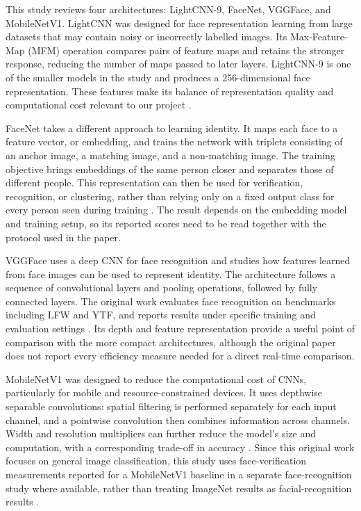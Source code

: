 \documentclass[11pt,a4paper,twocolumn]{article}
\begin{document}
This study reviews four architectures: LightCNN-9, FaceNet, VGGFace, and MobileNetV1. LightCNN was designed for face representation learning from large datasets that may contain noisy or incorrectly labelled images. Its Max-Feature-Map (MFM) operation compares pairs of feature maps and retains the stronger response, reducing the number of maps passed to later layers. LightCNN-9 is one of the smaller models in the study and produces a 256-dimensional face representation. These features make its balance of representation quality and computational cost relevant to our project \cite{wu2018lightcnn}.

FaceNet takes a different approach to learning identity. It maps each face to a feature vector, or embedding, and trains the network with triplets consisting of an anchor image, a matching image, and a non-matching image. The training objective brings embeddings of the same person closer and separates those of different people. This representation can then be used for verification, recognition, or clustering, rather than relying only on a fixed output class for every person seen during training \cite{schroff2015facenet}. The result depends on the embedding model and training setup, so its reported scores need to be read together with the protocol used in the paper.

VGGFace uses a deep CNN for face recognition and studies how features learned from face images can be used to represent identity. The architecture follows a sequence of convolutional layers and pooling operations, followed by fully connected layers. The original work evaluates face recognition on benchmarks including LFW and YTF, and reports results under specific training and evaluation settings \cite{parkhi2015deep}. Its depth and feature representation provide a useful point of comparison with the more compact architectures, although the original paper does not report every efficiency measure needed for a direct real-time comparison.

MobileNetV1 was designed to reduce the computational cost of CNNs, particularly for mobile and resource-constrained devices. It uses depthwise separable convolutions: spatial filtering is performed separately for each input channel, and a pointwise convolution then combines information across channels. Width and resolution multipliers can further reduce the model's size and computation, with a corresponding trade-off in accuracy \cite{howard2017mobilenets}. Since this original work focuses on general image classification, this study uses face-verification measurements reported for a MobileNetV1 baseline in a separate face-recognition study where available, rather than treating ImageNet results as facial-recognition results \cite{chen2018mobilefacenets}.
\end{document}
